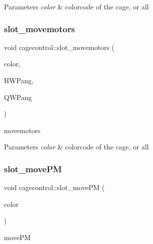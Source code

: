 \begin{DoxyParams}{Parameters}
{\em color} & colorcode of the cage, or \textquotesingle{}all\textquotesingle{} \\
\hline
\end{DoxyParams}
\mbox{\label{classcagecontrol_a2d971435af3267351272b2c2d5f2f709}} 
\subsubsection{\texorpdfstring{slot\+\_\+movemotors}{slot\_movemotors}}
{\footnotesize\ttfamily void cagecontrol\+::slot\+\_\+movemotors (\begin{DoxyParamCaption}\item[{Q\+String}]{color,  }\item[{double}]{H\+W\+Pang,  }\item[{double}]{Q\+W\+Pang }\end{DoxyParamCaption})\hspace{0.3cm}{\ttfamily [slot]}}



movemotors 


\begin{DoxyParams}{Parameters}
{\em color} & colorcode of the cage, or \textquotesingle{}all\textquotesingle{} \\
\hline
\end{DoxyParams}
\mbox{\label{classcagecontrol_a3207f15cba9458e32fb5c2cf366c4b44}} 
\subsubsection{\texorpdfstring{slot\+\_\+move\+PM}{slot\_movePM}}
{\footnotesize\ttfamily void cagecontrol\+::slot\+\_\+move\+PM (\begin{DoxyParamCaption}\item[{Q\+String}]{color }\end{DoxyParamCaption})\hspace{0.3cm}{\ttfamily [slot]}}



move\+PM 


